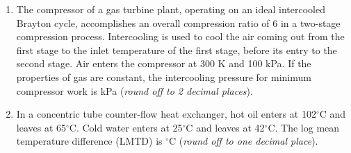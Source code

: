\documentclass[12pt,onecolumn]{article}
\begin{document}
\begin{enumerate}
    \item The compressor of a gas turbine plant, operating on an ideal intercooled Brayton cycle, accomplishes an overall compression ratio of 6 in a two-stage compression process. Intercooling is used to cool the air coming out from the first stage to the inlet temperature of the first stage, before its entry to the second stage. Air enters the compressor at 300 K and 100 kPa. If the properties of gas are constant, the intercooling pressure for minimum compressor work is \underline{\hspace{2cm}} kPa (\textit{round off to 2 decimal places}).

    \item In a concentric tube counter-flow heat exchanger, hot oil enters at 102$^\circ$C and leaves at 65$^\circ$C. Cold water enters at 25$^\circ$C and leaves at 42$^\circ$C. The log mean temperature difference (LMTD) is \underline{\hspace{2cm}} $^\circ$C (\textit{round off to one decimal place}).
\end{enumerate}
\end{document}
